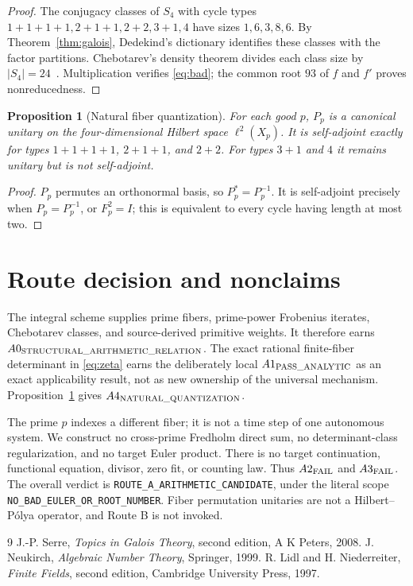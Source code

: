 \documentclass[10pt]{article}
\newtheorem{proposition}{Proposition}
\newcommand{\Scope}{\texttt{NO\_BAD\_EULER\_OR\_ROOT\_NUMBER}}
\begin{document}
\begin{proof}
The conjugacy classes of $S_4$ with cycle types
$1+1+1+1,2+1+1,2+2,3+1,4$ have sizes $1,6,3,8,6$.
By Theorem~\ref{thm:galois}, Dedekind's dictionary identifies these classes
with the factor partitions.  Chebotarev's density theorem divides each
class size by $|S_4|=24$~\cite{Neukirch}.  Multiplication verifies \eqref{eq:bad}; the common
root $93$ of $f$ and $f'$ proves nonreducedness.
\end{proof}

\begin{proposition}[Natural fiber quantization]\label{prop:koopman}
For each good $p$, $P_p$ is a canonical unitary on the four-dimensional
Hilbert space $\ell^2(X_p)$.  It is self-adjoint exactly for types
$1+1+1+1$, $2+1+1$, and $2+2$.  For types $3+1$ and $4$ it remains unitary
but is not self-adjoint.
\end{proposition}

\begin{proof}
$P_p$ permutes an orthonormal basis, so $P_p^*=P_p^{-1}$.  It is
self-adjoint precisely when $P_p=P_p^{-1}$, or $F_p^2=I$; this is equivalent
to every cycle having length at most two.
\end{proof}

\section{Route decision and nonclaims}
The integral scheme supplies prime fibers, prime-power Frobenius iterates,
Chebotarev classes, and source-derived primitive weights.  It therefore
earns $A0_{\rm STRUCTURAL\_ARITHMETIC\_RELATION}$.  The exact rational
finite-fiber determinant in \eqref{eq:zeta} earns the deliberately local
$A1_{\rm PASS\_ANALYTIC}$ as an exact applicability result, not as new
ownership of the universal mechanism.  Proposition~\ref{prop:koopman} gives
$A4_{\rm NATURAL\_QUANTIZATION}$.

The prime $p$ indexes a different fiber; it is not a time step of one
autonomous system.  We construct no cross-prime Fredholm direct sum, no
determinant-class regularization, and no target Euler product.  There is no
target continuation, functional equation, divisor, zero fit, or counting
law.  Thus $A2_{\rm FAIL}$ and $A3_{\rm FAIL}$.  The overall verdict is
\texttt{ROUTE\_A\_ARITHMETIC\_CANDIDATE}, under the literal scope
\Scope.  Fiber permutation unitaries are not a Hilbert--P\'olya operator,
and Route B is not invoked.
\fi

\begin{thebibliography}{9}\small
{} J.-P. Serre,
\emph{Topics in Galois Theory}, second edition, A K Peters, 2008.
 J. Neukirch,
\emph{Algebraic Number Theory}, Springer, 1999.
 R. Lidl and H. Niederreiter,
\emph{Finite Fields}, second edition, Cambridge University Press, 1997.
\end{thebibliography}
\end{document}
